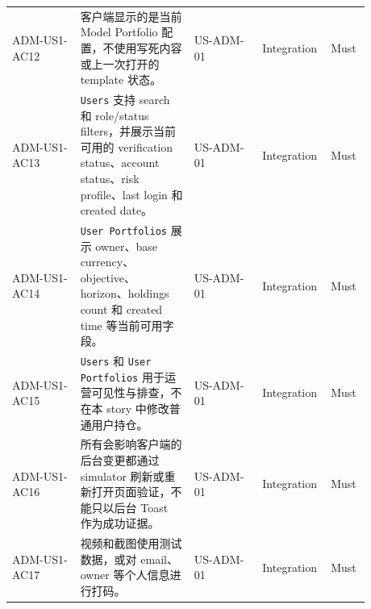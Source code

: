 \begin{longtable}{L{0.18\linewidth}L{0.30\linewidth}L{0.18\linewidth}L{0.12\linewidth}L{0.10\linewidth}}
ADM-US1-AC12 & 客户端显示的是当前 Model Portfolio 配置，不使用写死内容或上一次打开的 template 状态。 & US-ADM-01 & Integration & Must \\
ADM-US1-AC13 & \texttt{Users} 支持 search 和 role/\allowbreak{}status filters，并展示当前可用的 verification status、account status、risk profile、last login 和 created date。 & US-ADM-01 & Integration & Must \\
ADM-US1-AC14 & \texttt{User Portfolios} 展示 owner、base currency、objective、horizon、holdings count 和 created time 等当前可用字段。 & US-ADM-01 & Integration & Must \\
ADM-US1-AC15 & \texttt{Users} 和 \texttt{User Portfolios} 用于运营可见性与排查，不在本 story 中修改普通用户持仓。 & US-ADM-01 & Integration & Must \\
ADM-US1-AC16 & 所有会影响客户端的后台变更都通过 simulator 刷新或重新打开页面验证，不能只以后台 Toast 作为成功证据。 & US-ADM-01 & Integration & Must \\
ADM-US1-AC17 & 视频和截图使用测试数据，或对 email、owner 等个人信息进行打码。 & US-ADM-01 & Integration & Must \\
\bottomrule
\end{longtable}
\endgroup
